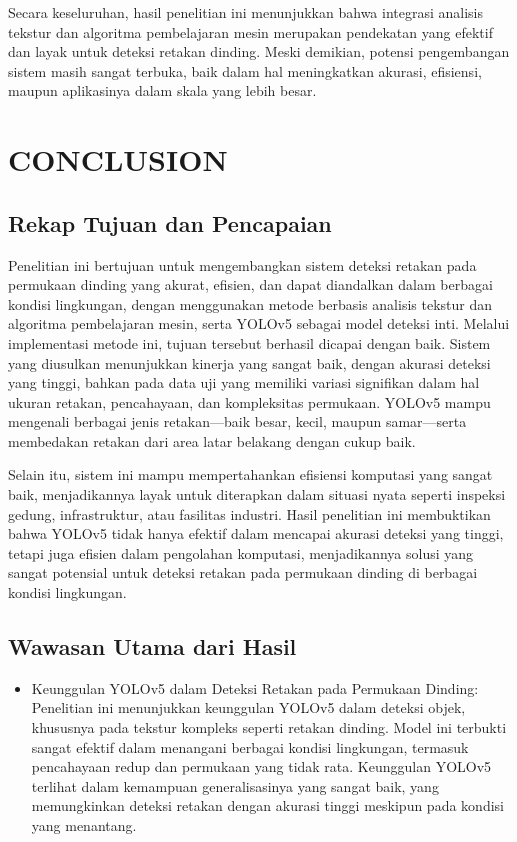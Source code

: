 \documentclass[12pt,a4paper]{article}
\begin{document}
\begin{adjustwidth}{3em}{0pt}
Secara keseluruhan, hasil penelitian ini menunjukkan bahwa integrasi analisis tekstur dan algoritma pembelajaran mesin merupakan pendekatan yang efektif dan layak untuk deteksi retakan dinding. Meski demikian, potensi pengembangan sistem masih sangat terbuka, baik dalam hal meningkatkan akurasi, efisiensi, maupun aplikasinya dalam skala yang lebih besar.

\end{adjustwidth}

\section{CONCLUSION}
\begin{adjustwidth}{3em}{0pt}
\subsection{Rekap Tujuan dan Pencapaian}
\hspace{0.5cm} Penelitian ini bertujuan untuk mengembangkan sistem deteksi retakan pada permukaan dinding yang akurat, efisien, dan dapat diandalkan dalam berbagai kondisi lingkungan, dengan menggunakan metode berbasis analisis tekstur dan algoritma pembelajaran mesin, serta YOLOv5 sebagai model deteksi inti. Melalui implementasi metode ini, tujuan tersebut berhasil dicapai dengan baik. Sistem yang diusulkan menunjukkan kinerja yang sangat baik, dengan akurasi deteksi yang tinggi, bahkan pada data uji yang memiliki variasi signifikan dalam hal ukuran retakan, pencahayaan, dan kompleksitas permukaan. YOLOv5 mampu mengenali berbagai jenis retakan—baik besar, kecil, maupun samar—serta membedakan retakan dari area latar belakang dengan cukup baik.

Selain itu, sistem ini mampu mempertahankan efisiensi komputasi yang sangat baik, menjadikannya layak untuk diterapkan dalam situasi nyata seperti inspeksi gedung, infrastruktur, atau fasilitas industri. Hasil penelitian ini membuktikan bahwa YOLOv5 tidak hanya efektif dalam mencapai akurasi deteksi yang tinggi, tetapi juga efisien dalam pengolahan komputasi, menjadikannya solusi yang sangat potensial untuk deteksi retakan pada permukaan dinding di berbagai kondisi lingkungan.

\subsection{Wawasan Utama dari Hasil}
\begin{itemize}
    \item Keunggulan YOLOv5 dalam Deteksi Retakan pada Permukaan Dinding: Penelitian ini menunjukkan keunggulan YOLOv5 dalam deteksi objek, khususnya pada tekstur kompleks seperti retakan dinding. Model ini terbukti sangat efektif dalam menangani berbagai kondisi lingkungan, termasuk pencahayaan redup dan permukaan yang tidak rata. Keunggulan YOLOv5 terlihat dalam kemampuan generalisasinya yang sangat baik, yang memungkinkan deteksi retakan dengan akurasi tinggi meskipun pada kondisi yang menantang.


\end{itemize}
\end{adjustwidth}
\end{document}
